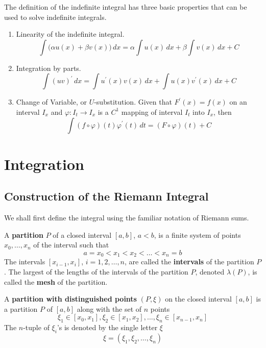 \documentclass{article}
\begin{document}
      \begin{theorem}
      The definition of the indefinite integral has three basic properties that can be used to solve indefinite integrals. 
      \begin{enumerate}
        \item Linearity of the indefinite integral.
        \[\int \big( \alpha u(x) + \beta v(x)\big) \, dx = \alpha \int u(x)\,dx + \beta \int v(x)\,dx + C\]
        \item Integration by parts. 
        \[\int (u v)^\prime \,dx = \int u^\prime (x) v(x) \,dx + \int u(x) v^\prime (x) \,dx + C\]
        \item Change of Variable, or $U$-substitution. Given that $F^\prime (x) = f(x)$ on an interval $I_x$ and $\varphi: I_t \longrightarrow I_x$ is a $C^1$ mapping of interval $I_t$ into $I_x$, then
        \[\int (f \circ \varphi) (t) \varphi^\prime (t) \,dt = (F \circ \varphi)(t) + C\]
      \end{enumerate}
      \end{theorem}

  \section{Integration}

    \subsection{Construction of the Riemann Integral}

      We shall first define the integral using the familiar notation of Riemann sums. 

      \begin{definition}
        A \textbf{partition} $P$ of a closed interval $[a, b]$, $a < b$, is a finite system of points $x_0, \ldots, x_n$ of the interval such that
        \[a = x_0 < x_1 < x_2 < \ldots < x_n = b\]
        The intervals $[x_{i-1}, x_i]$, $i = 1, 2, \ldots, n$, are called the \textbf{intervals} of the partition $P$. The largest of the lengths of the intervals of the partition $P$, denoted $\lambda(P)$, is called the \textbf{mesh} of the partition. 

        A \textbf{partition with distinguished points} $(P, \xi)$ on the closed interval $[a, b]$ is a partition $P$ of $[a,b]$ along with the set of $n$ points 
        \[\xi_1 \in [x_0, x_1], \xi_2 \in [x_1, x_2], \ldots, \xi_n \in [x_{n-1}, x_n]\]
        The $n$-tuple of $\xi_i$'s is denoted by the single letter $\xi$
        \[\xi = (\xi_1, \xi_2, \ldots, \xi_n)\]
      \end{definition}
\end{document}
